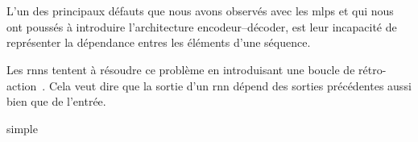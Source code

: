 \section{}
\label{sec.rnn}

L'un des principaux défauts que nous avons observés avec les \glspl{mlp} 
et qui nous ont poussés à introduire l'architecture encodeur--décoder,
est leur incapacité de représenter la dépendance entres les éléments d'une séquence.

Les \glspl{rnn} tentent à résoudre ce problème en introduisant une boucle de rétro-action~\cite{Fathi_2021}.
Cela veut dire que la sortie d'un \gls{rnn} dépend des sorties précédentes aussi bien que de l'entrée.

{simple}